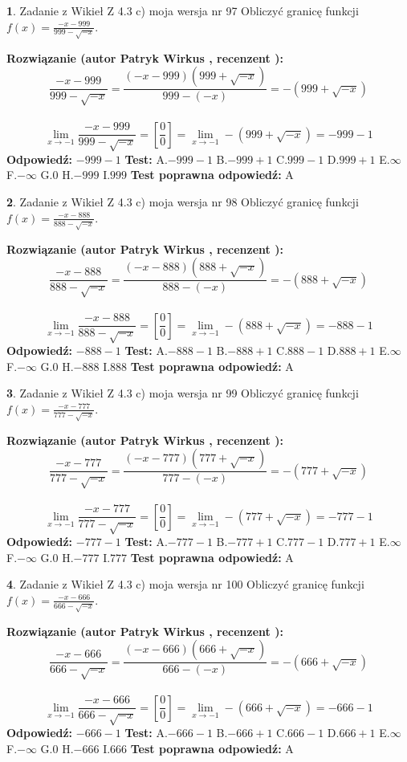 \documentclass[12pt, a4paper]{article}
\theoremstyle{definition} %
\newtheorem{zad}{}
\newcommand{\zadStart}[1]{\begin{zad}#1\newline}
\newcommand{\zadStop}{\end{zad}}
\newcommand{\rozwStart}[2]{\noindent \textbf{Rozwiązanie (autor #1 , recenzent #2): }\newline}
\newcommand{\rozwStop}{\newline}
\newcommand{\odpStart}{\noindent \textbf{Odpowiedź:}\newline}
\newcommand{\odpStop}{\newline}
\newcommand{\testStart}{\noindent \textbf{Test:}\newline}
\newcommand{\testStop}{\newline}
\newcommand{\kluczStart}{\noindent \textbf{Test poprawna odpowiedź:}\newline}
\newcommand{\kluczStop}{\newline}
\begin{document}
\zadStart{Zadanie z Wikieł Z 4.3 c) moja wersja nr 97}
Obliczyć granicę funkcji $f(x)=\frac{-x-999}{999-\sqrt{-x}}$.
\zadStop
\rozwStart{Patryk Wirkus}{}
$$\frac{-x-999}{999-\sqrt{-x}}=\frac{(-x-999)(999+\sqrt{-x})}{999-(-x)}=-(999+\sqrt{-x})$$
\\
$$\lim\limits_{x\to-1}\frac{-x-999}{999-\sqrt{-x}}=[\frac{0}{0}]=\lim\limits_{x\to-1}-(999+\sqrt{-x}) =-999-1$$
\rozwStop
\odpStart
$-999-1$
\odpStop
\testStart
A.$-999-1$
B.$-999+1$
C.$999-1$
D.$999+1$
E.$\infty$
F.$-\infty$
G.$0$
H.$-999$
I.$999$
\testStop
\kluczStart
A
\kluczStop



\zadStart{Zadanie z Wikieł Z 4.3 c) moja wersja nr 98}
Obliczyć granicę funkcji $f(x)=\frac{-x-888}{888-\sqrt{-x}}$.
\zadStop
\rozwStart{Patryk Wirkus}{}
$$\frac{-x-888}{888-\sqrt{-x}}=\frac{(-x-888)(888+\sqrt{-x})}{888-(-x)}=-(888+\sqrt{-x})$$
\\
$$\lim\limits_{x\to-1}\frac{-x-888}{888-\sqrt{-x}}=[\frac{0}{0}]=\lim\limits_{x\to-1}-(888+\sqrt{-x}) =-888-1$$
\rozwStop
\odpStart
$-888-1$
\odpStop
\testStart
A.$-888-1$
B.$-888+1$
C.$888-1$
D.$888+1$
E.$\infty$
F.$-\infty$
G.$0$
H.$-888$
I.$888$
\testStop
\kluczStart
A
\kluczStop



\zadStart{Zadanie z Wikieł Z 4.3 c) moja wersja nr 99}
Obliczyć granicę funkcji $f(x)=\frac{-x-777}{777-\sqrt{-x}}$.
\zadStop
\rozwStart{Patryk Wirkus}{}
$$\frac{-x-777}{777-\sqrt{-x}}=\frac{(-x-777)(777+\sqrt{-x})}{777-(-x)}=-(777+\sqrt{-x})$$
\\
$$\lim\limits_{x\to-1}\frac{-x-777}{777-\sqrt{-x}}=[\frac{0}{0}]=\lim\limits_{x\to-1}-(777+\sqrt{-x}) =-777-1$$
\rozwStop
\odpStart
$-777-1$
\odpStop
\testStart
A.$-777-1$
B.$-777+1$
C.$777-1$
D.$777+1$
E.$\infty$
F.$-\infty$
G.$0$
H.$-777$
I.$777$
\testStop
\kluczStart
A
\kluczStop



\zadStart{Zadanie z Wikieł Z 4.3 c) moja wersja nr 100}
Obliczyć granicę funkcji $f(x)=\frac{-x-666}{666-\sqrt{-x}}$.
\zadStop
\rozwStart{Patryk Wirkus}{}
$$\frac{-x-666}{666-\sqrt{-x}}=\frac{(-x-666)(666+\sqrt{-x})}{666-(-x)}=-(666+\sqrt{-x})$$
\\
$$\lim\limits_{x\to-1}\frac{-x-666}{666-\sqrt{-x}}=[\frac{0}{0}]=\lim\limits_{x\to-1}-(666+\sqrt{-x}) =-666-1$$
\rozwStop
\odpStart
$-666-1$
\odpStop
\testStart
A.$-666-1$
B.$-666+1$
C.$666-1$
D.$666+1$
E.$\infty$
F.$-\infty$
G.$0$
H.$-666$
I.$666$
\testStop
\kluczStart
A
\kluczStop
\end{document}
